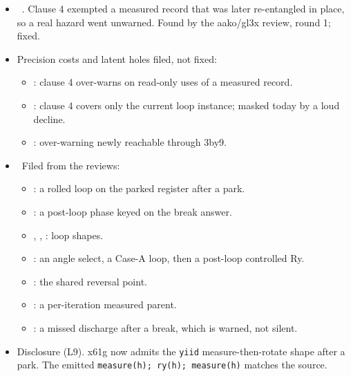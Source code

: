 \begin{itemize}
  was deleted as global. It is now a loud decline (E16). Found by the 3by9 review, round 1;
  3by9 had added the kickback spelling (L9).
  \item \fpreexisting\ . Clause 4 exempted a measured record
  that was later re-entangled in place, so a real hazard went unwarned. Found by the
  aako/gl3x review, round 1; fixed.
  \item Precision costs and latent holes filed, not fixed:
  \begin{itemize}
    \item {}: clause 4 over-warns on read-only uses of a measured
    record.
    \item {}: clause 4 covers only the current loop instance;
    masked today by a loud decline.
    \item {}: over-warning newly reachable through 3by9.
  \end{itemize}
  \item \foverdecline\ Filed from the reviews:
  \begin{itemize}
    \item {}: a rolled loop on the parked register after a park.
    \item {}: a post-loop phase keyed on the break answer.
    \item {}, ,
    : loop shapes.
    \item {}: an angle select, a Case-A loop, then a post-loop
    controlled Ry.
    \item {}: the shared reversal point.
    \item {}: a per-iteration measured parent.
    \item {}: a missed discharge after a break, which is
    warned, not silent.
  \end{itemize}
  \item Disclosure (L9). x61g now admits the \texttt{yiid} measure-then-rotate shape after a
  park. The emitted \texttt{measure(h); ry(h); measure(h)} matches the source.
\end{itemize}

